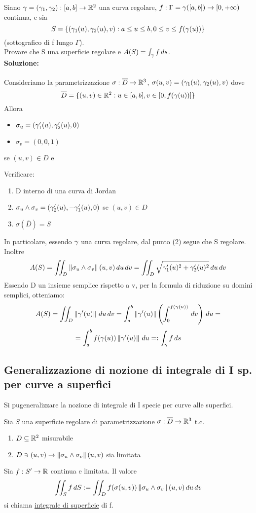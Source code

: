\begin{exercise}
  Siano $\gamma = (\gamma_1,\gamma_2):[a,b]\to\mathbb{R}^2$ una curva regolare, 
  $f:\Gamma = \gamma([a,b])\to [0,+\infty)$ continua, e sia
  $$S=\{\left(\gamma_1(u),\gamma_2(u),v\right): a \leq u\leq b, 0 \leq v \leq f(\gamma(u))\}$$
  (sottografico di f lungo $\Gamma$). \\
  Provare che S \ace una superficie regolare e $A(S) = \int_{\gamma} f \,ds$. \\
  \textbf{Soluzione:} \\\\
  Consideriamo la parametrizzazione $\sigma:\overline{D}\to\mathbb{R}^3$, $\sigma(u,v)=\left(\gamma_1(u),\gamma_2(u),v\right)$
  dove 
  $$\overline{D} = \{(u,v)\in\mathbb{R}^2: u \in [a,b], v \in [0,f(\gamma(u))]\}$$
  Allora \begin{itemize}
    \item $\sigma_u = \left(\gamma_1'(u),\gamma_2'(u), 0\right)$
    \item $\sigma_v = (0,0,1)$
  \end{itemize}
  se $(u,v)\in D$ e 
  \begin{exercise}
    Verificare:
    \begin{enumerate}
      \item D \ace interno di una curva di Jordan
      \item $\sigma_u\wedge\sigma_v= \left(\gamma_2'(u),-\gamma_1'(u),0\right)$ se $(u,v)\in D$
      \item $\sigma(\overline{D}) = S$
    \end{enumerate}
  \end{exercise}
  In particolare, essendo $\gamma$ una curva regolare, dal punto (2) segue che S \ace regolare.
  Inoltre 
  $$A(S) = \iint_{D} \left\lVert\sigma_u\wedge\sigma_v\right\rVert(u,v) \,du\,dv = 
          \iint_{D} \sqrt{\gamma_1'(u)^2 + \gamma_2'(u)^2} \,du\,dv$$
  Essendo D un insieme semplice rispetto a v, per la formula di riduzione su domini semplici,
  otteniamo:
  $$A(S) = \iint_{D}\left\lVert\gamma'(u)\right\rVert\,du\,dv = \int_{a}^{b}\left\lVert\gamma'(u)\right\rVert\left(\int_{0}^{f(\gamma(u))} \,dv\right)\,du = $$
  $$= \int_{a}^{b} f(\gamma(u))\left\lVert\gamma'(u)\right\rVert\,du =: \int_{\gamma} f \, ds$$
\end{exercise}
\subsection{Generalizzazione di nozione di integrale di I sp. per curve a superfici}
Si pu\aco generalizzare la nozione di integrale di I specie per curve alle superfici.
\begin{definition}
  Sia $S$ una superficie regolare di parametrizzazione $\sigma:\overline{D}\to\mathbb{R}^3$ t.c. 
  \begin{enumerate}
    \item $D\subseteq \mathbb{R}^2$ misurabile
    \item $D\ni (u,v) \to \left\lVert\sigma_u\wedge\sigma_v\right\rVert(u,v)$ sia limitata
  \end{enumerate}
  Sia $f:S' \to \mathbb{R}$ continua e limitata. Il valore
  $$\iint_{S} f \,dS := \iint_{D} f(\sigma(u,v))\left\lVert\sigma_u\wedge\sigma_v\right\rVert(u,v) \,du\,dv$$
  si chiama \underline{integrale di superficie} di f.
\end{definition}
